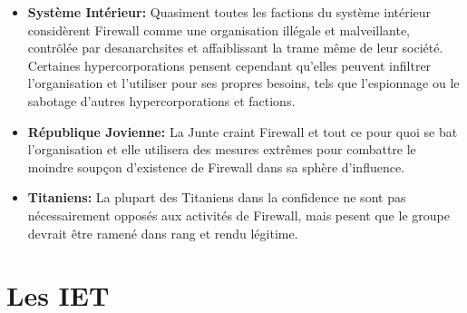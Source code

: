 \begin{itemize}
   \item \textbf{Système Intérieur:} Quasiment toutes les factions du système intérieur considèrent Firewall comme une organisation illégale et malveillante, contrõlée par desanarchsites et affaiblissant la trame même de leur société. Certaines hypercorporations pensent cependant qu'elles peuvent infiltrer l'organisation et l'utiliser pour ses propres besoins, tels que l'espionnage ou le sabotage d'autres hypercorporations et factions.
   \item \textbf{République Jovienne:} La Junte craint Firewall et tout ce pour quoi se bat l'organisation et elle utilisera des mesures extrêmes pour combattre le moindre soupçon d'existence de Firewall dans sa sphère d'influence.
   \item \textbf{Titaniens:} La plupart des Titaniens dans la confidence ne sont pas nécessairement opposés aux activités de Firewall, mais pesent que le groupe devrait être ramené dans rang et rendu légitime.
\end{itemize} 

\section{Les IET } 

